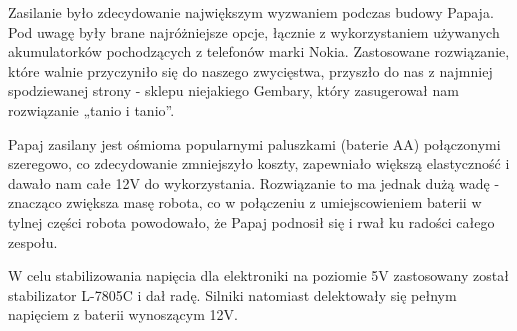 Zasilanie było zdecydowanie największym wyzwaniem podczas budowy Papaja. Pod uwagę były brane najróżniejsze opcje, łącznie z wykorzystaniem używanych akumulatorków pochodzących z telefonów marki Nokia. Zastosowane rozwiązanie, które walnie przyczyniło się do naszego zwycięstwa, przyszło do nas z najmniej spodziewanej strony - sklepu niejakiego Gembary, który zasugerował nam rozwiązanie „tanio i tanio”.

Papaj zasilany jest ośmioma popularnymi paluszkami (baterie AA) połączonymi szeregowo, co zdecydowanie zmniejszyło koszty, zapewniało większą elastyczność i dawało nam całe 12V do wykorzystania. Rozwiązanie to ma jednak dużą wadę - znacząco zwiększa masę robota, co w połączeniu z umiejscowieniem baterii w tylnej części robota powodowało, że Papaj podnosił się i rwał ku radości całego zespołu. 

W celu stabilizowania napięcia dla elektroniki na poziomie 5V zastosowany został stabilizator L-7805C i dał radę.  Silniki natomiast delektowały się pełnym napięciem z baterii wynoszącym 12V.
